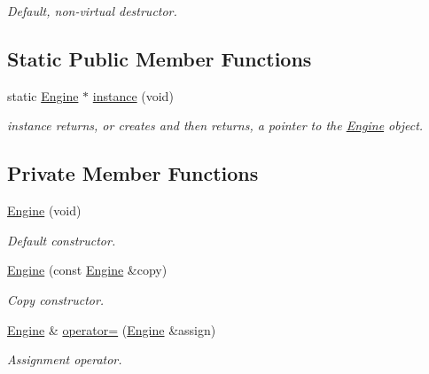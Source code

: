 \begin{DoxyCompactItemize}
\begin{DoxyCompactList}\small\item\em Default, non-\/virtual destructor. \end{DoxyCompactList}\end{DoxyCompactItemize}
\subsection*{Static Public Member Functions}
\begin{DoxyCompactItemize}
\item 
static \hyperlink{class_engine}{Engine} $\ast$ \hyperlink{class_engine_a6cbf9ec80a4a3bb245355ff70498dba0}{instance} (void)
\begin{DoxyCompactList}\small\item\em instance returns, or creates and then returns, a pointer to the \hyperlink{class_engine}{Engine} object. \end{DoxyCompactList}\end{DoxyCompactItemize}
\subsection*{Private Member Functions}
\begin{DoxyCompactItemize}
\item 
\hyperlink{class_engine_a9ad87e382195a05d5d310a2fb3e357fd}{Engine} (void)
\begin{DoxyCompactList}\small\item\em Default constructor. \end{DoxyCompactList}\item 
\hyperlink{class_engine_a8e027119a62020acddedd0a14fb44033}{Engine} (const \hyperlink{class_engine}{Engine} \&copy)
\begin{DoxyCompactList}\small\item\em Copy constructor. \end{DoxyCompactList}\item 
\hyperlink{class_engine}{Engine} \& \hyperlink{class_engine_a09761dabaae6f48bd5c612acea76a9bf}{operator=} (\hyperlink{class_engine}{Engine} \&assign)
\begin{DoxyCompactList}\small\item\em Assignment operator. \end{DoxyCompactList}\end{DoxyCompactItemize}

